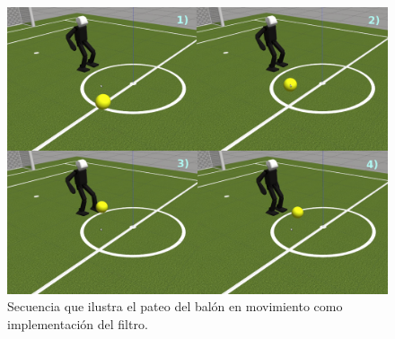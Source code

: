 \begin{figure}
\centering
	\includegraphics[scale=0.2]{images/final_test.png}
	\caption{Secuencia que ilustra el pateo del balón en movimiento como implementación del filtro.}
\label{fig:final_test}
\end{figure} 